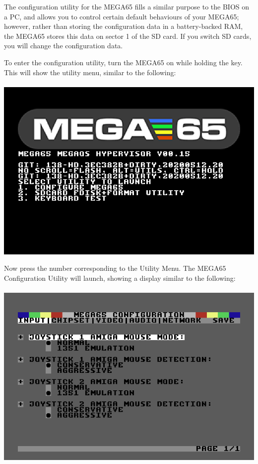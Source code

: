 The configuration utility for the MEGA65 fills a similar purpose to the BIOS on a PC, and allows you to control certain default behaviours of your MEGA65; however, rather than storing the configuration data in a
battery-backed RAM, the MEGA65 stores this data on sector 1 of the SD card. If you switch SD cards, you will change the configuration data.


\begin{minipage}{\linewidth}
  To enter the configuration utility, turn the MEGA65 on while
  holding the  key.  This will show the utility menu,
  similar to the following: \\
  \\
  \includegraphics[width=\linewidth]{images/ss-utilmenu.png}
\end{minipage}

\begin{minipage}{\linewidth}
  Now press the number corresponding to the Utility Menu.  The MEGA65
  Configuration Utility will launch, showing a display similar to
  the following: \\
  \\
  \includegraphics[width=\linewidth]{images/ss-m65config-1.png}
\end{minipage}

